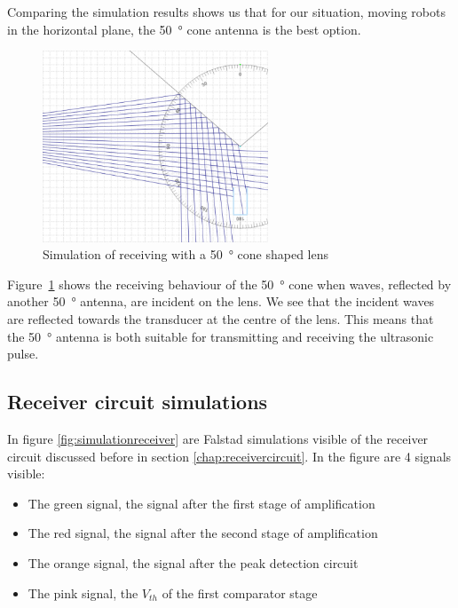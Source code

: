 Comparing the simulation results shows us that for our situation, moving robots in the horizontal plane, the \SI{50}{\degree} cone antenna is the best option.

\begin{figure}[H]
\centering
\includegraphics[width=0.6\textwidth]{Figures/sim_cone_rec.PNG}
\caption{Simulation of receiving with a \SI{50}{\degree} cone shaped lens}
\label{fig:sim_cone_rec}
\end{figure}

Figure~\ref{fig:sim_cone_rec} shows the receiving behaviour of the \SI{50}{\degree} cone when waves, reflected by another \SI{50}{\degree} antenna, are incident on the lens.
We see that the incident waves are reflected towards the transducer at the centre of the lens.
This means that the \SI{50}{\degree} antenna is both suitable for transmitting and receiving the ultrasonic pulse.

\subsection{Receiver circuit simulations}

In figure \ref{fig:simulationreceiver} are Falstad \cite{Falstad}
simulations visible of the receiver circuit discussed before in section \ref{chap:receivercircuit}. In the figure are 4 signals visible:

\begin{itemize}
\item
The green signal, the signal after the first stage of amplification
\item
The red signal, the signal after the second stage of amplification
\item
The orange signal, the signal after the peak detection circuit
\item
The pink signal, the $V_{th}$ of the first comparator stage
\end{itemize}

